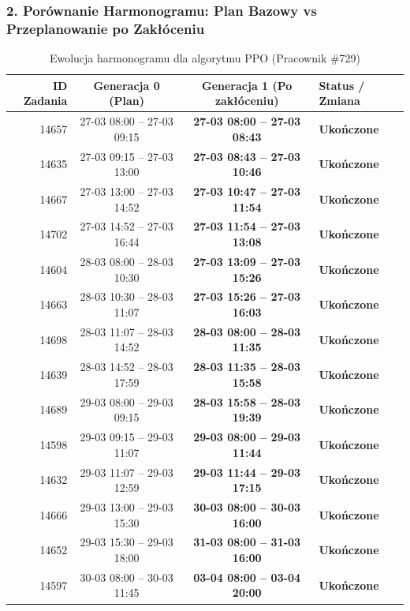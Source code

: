 \subsubsection*{2. Porównanie Harmonogramu: Plan Bazowy vs Przeplanowanie po Zakłóceniu}

\begin{table}[htbp]
\centering\small
\caption{Ewolucja harmonogramu dla algorytmu PPO (Pracownik \#729)}
\label{tab:case_study_ppo_u729}
\begin{tabular}{|r|c|c|l|}
\hline
\textbf{ID Zadania} & \textbf{Generacja 0 (Plan)} & \textbf{Generacja 1 (Po zakłóceniu)} & \textbf{Status / Zmiana} \\ \hline
14657 & 27-03 08:00 -- 27-03 09:15 & \textbf{27-03 08:00 -- 27-03 08:43} & \textbf{Ukończone} \\ 
14635 & 27-03 09:15 -- 27-03 13:00 & \textbf{27-03 08:43 -- 27-03 10:46} & \textbf{Ukończone} \\ 
14667 & 27-03 13:00 -- 27-03 14:52 & \textbf{27-03 10:47 -- 27-03 11:54} & \textbf{Ukończone} \\ 
14702 & 27-03 14:52 -- 27-03 16:44 & \textbf{27-03 11:54 -- 27-03 13:08} & \textbf{Ukończone} \\ 
14604 & 28-03 08:00 -- 28-03 10:30 & \textbf{27-03 13:09 -- 27-03 15:26} & \textbf{Ukończone} \\ 
14663 & 28-03 10:30 -- 28-03 11:07 & \textbf{27-03 15:26 -- 27-03 16:03} & \textbf{Ukończone} \\ 
14698 & 28-03 11:07 -- 28-03 14:52 & \textbf{28-03 08:00 -- 28-03 11:35} & \textbf{Ukończone} \\ 
14639 & 28-03 14:52 -- 28-03 17:59 & \textbf{28-03 11:35 -- 28-03 15:58} & \textbf{Ukończone} \\ 
14689 & 29-03 08:00 -- 29-03 09:15 & \textbf{28-03 15:58 -- 28-03 19:39} & \textbf{Ukończone} \\ 
14598 & 29-03 09:15 -- 29-03 11:07 & \textbf{29-03 08:00 -- 29-03 11:44} & \textbf{Ukończone} \\ 
14632 & 29-03 11:07 -- 29-03 12:59 & \textbf{29-03 11:44 -- 29-03 17:15} & \textbf{Ukończone} \\ 
14666 & 29-03 13:00 -- 29-03 15:30 & \textbf{30-03 08:00 -- 30-03 16:00} & \textbf{Ukończone} \\ 
14652 & 29-03 15:30 -- 29-03 18:00 & \textbf{31-03 08:00 -- 31-03 16:00} & \textbf{Ukończone} \\ 
14597 & 30-03 08:00 -- 30-03 11:45 & \textbf{03-04 08:00 -- 03-04 20:00} & \textbf{Ukończone} \\ 

\end{tabular}
\end{table}
